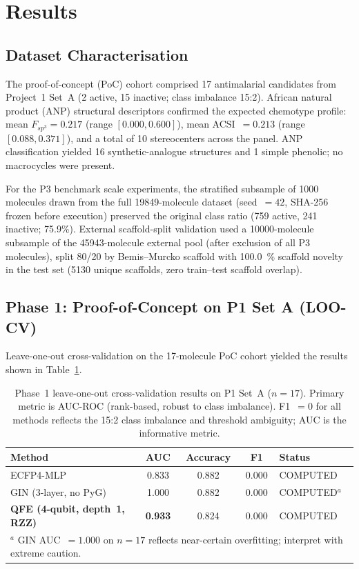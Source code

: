 \section{Results}

\subsection{Dataset Characterisation}

The proof-of-concept (PoC) cohort comprised \num{17} antimalarial candidates from
Project~1 Set~A (\num{2} active, \num{15} inactive; class imbalance 15:2). African
natural product (ANP) structural descriptors confirmed the expected chemotype
profile: mean $F_{sp^3} = 0.217$ (range $[0.000, 0.600]$), mean
ACSI~$= 0.213$ (range $[0.088, 0.371]$), and a total of \num{10} stereocenters
across the panel. ANP classification yielded \num{16} synthetic-analogue structures
and \num{1} simple phenolic; no macrocycles were present.

For the P3 benchmark scale experiments, the stratified subsample of
\num{1000} molecules drawn from the full \num{19849}-molecule dataset
(seed~$= 42$, SHA-256 frozen before execution) preserved the original class ratio
(\num{759} active, \num{241} inactive; 75.9\%). External scaffold-split validation
used a \num{10000}-molecule subsample of the \num{45943}-molecule external pool
(after exclusion of all P3 molecules), split 80/20 by Bemis--Murcko scaffold with
\qty{100.0}{\percent} scaffold novelty in the test set (\num{5130} unique scaffolds,
zero train--test scaffold overlap).


\subsection{Phase 1: Proof-of-Concept on P1 Set A (LOO-CV)}

Leave-one-out cross-validation on the \num{17}-molecule PoC cohort yielded the
results shown in Table~\ref{tab:phase1_loo}.

\begin{table}[htbp]
\centering
\caption{Phase~1 leave-one-out cross-validation results on P1 Set~A ($n = 17$).
Primary metric is AUC-ROC (rank-based, robust to class imbalance).
F1~$= 0$ for all methods reflects the 15:2 class imbalance and threshold
ambiguity; AUC is the informative metric.}
\label{tab:phase1_loo}
\begin{tabular}{lcccl}
\toprule
Method & AUC & Accuracy & F1 & Status \\
\midrule
ECFP4-MLP  & 0.833 & 0.882 & 0.000 & COMPUTED \\
GIN (3-layer, no PyG)  & 1.000 & 0.882 & 0.000 & COMPUTED$^a$ \\
\textbf{QFE (4-qubit, depth~1, RZZ)}
             & \textbf{0.933} & 0.824 & 0.000 & COMPUTED \\
\bottomrule
\multicolumn{5}{l}{%
  $^a$ GIN AUC~$= 1.000$ on $n = 17$ reflects near-certain overfitting; interpret
  with extreme caution.
}
\end{tabular}
\end{table}

